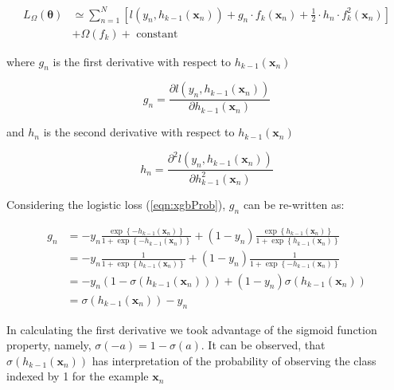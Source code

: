 \begin{equation}
\begin{aligned}
L_{\Omega}(\boldsymbol{\theta}) & \simeq \sum_{n=1}^{N}\left[l\left(y_{n}, h_{k-1}\left(\mathbf{x}_{n}\right)\right)+g_{n} \cdot f_{k}\left(\mathbf{x}_{n}\right)+\frac{1}{2} \cdot h_{n} \cdot f_{k}^{2}\left(\mathbf{x}_{n}\right)\right] \\
&+\Omega\left(f_{k}\right)+\text { constant }
\end{aligned}
\end{equation}

where $g_{n}$ is the first derivative with respect to $h_{k-1}\left(\mathbf{x}_{n}\right)$

\begin{equation}
g_{n}=\frac{\partial l\left(y_{n}, h_{k-1}\left(\mathbf{x}_{n}\right)\right)}{\partial h_{k-1}\left(\mathbf{x}_{n}\right)}
\end{equation}

and $h_{n}$ is the second derivative with respect to $h_{k-1}\left(\mathbf{x}_{n}\right)$

\begin{equation}
h_{n}=\frac{\partial^{2} l\left(y_{n}, h_{k-1}\left(\mathbf{x}_{n}\right)\right)}{\partial h_{k-1}^{2}\left(\mathbf{x}_{n}\right)}
\end{equation}


Considering the logistic loss (\autoref{eqn:xgbProb}), $g_n$ can be re-written as:

\begin{equation}
\begin{aligned}
g_{n} &=-y_{n} \frac{\exp \left\{-h_{k-1}\left(\mathbf{x}_{n}\right)\right\}}{1+\exp \left\{-h_{k-1}\left(\mathbf{x}_{n}\right)\right\}}+\left(1-y_{n}\right) \frac{\exp \left\{h_{k-1}\left(\mathbf{x}_{n}\right)\right\}}{1+\exp \left\{h_{k-1}\left(\mathbf{x}_{n}\right)\right\}} \\
&=-y_{n} \frac{1}{1+\exp \left\{h_{k-1}\left(\mathbf{x}_{n}\right)\right\}}+\left(1-y_{n}\right) \frac{1}{1+\exp \left\{-h_{k-1}\left(\mathbf{x}_{n}\right)\right\}} \\
&=-y_{n}\left(1-\sigma\left(h_{k-1}\left(\mathbf{x}_{n}\right)\right)\right)+\left(1-y_{n}\right) \sigma\left(h_{k-1}\left(\mathbf{x}_{n}\right)\right) \\
&=\sigma\left(h_{k-1}\left(\mathbf{x}_{n}\right)\right)-y_{n}
\end{aligned}
\end{equation}


In calculating the first derivative we took advantage of the sigmoid function property, namely, $\sigma(-a)=1-\sigma(a) .$ It can be observed, that $\sigma\left(h_{k-1}\left(\mathbf{x}_{n}\right)\right)$ has interpretation of the probability of observing the class indexed by 1 for the example $\mathbf{x}_{n}$

